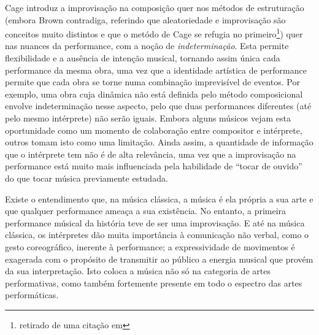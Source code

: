 \documentclass[../main.tex]{subfiles}
\begin{document}
Cage introduz a improvisação na composição quer nos métodos de estruturação (embora Brown contradiga, referindo que aleatoriedade e improvisação são conceitos muito distintos e que o metódo de Cage se refugia no primeiro\footnote{retirado de uma citação em\cite{derek}}) quer nas nuances da performance, com a noção de \textsl{indeterminação}\cite{cage1961}. Esta permite flexibilidade e a ausência de intenção musical, tornando assim única cada performance da mesma obra\cite{cage1961,goldberg}, uma vez que a identidade artística de performance permite que cada obra se torne numa combinação imprevisível de eventos\cite{goldberg_battcock}. Por exemplo, uma obra cuja dinâmica não está definida pelo método composicional envolve indeterminação nesse aspecto, pelo que duas performances diferentes (até pelo mesmo intérprete) não serão iguais. Embora alguns músicos vejam esta oportunidade como um momento de colaboração entre compositor e intérprete, outros tomam isto como uma limitação\cite{derek}. Ainda assim, a quantidade de informação que o intérprete tem não é de alta relevância, uma vez que a improvisação na performance está muito mais influenciada pela habilidade de \enquote{tocar de ouvido} do que tocar música previamente estudada\cite{gabrielsson}.

Existe o entendimento que, na música clássica, a música é ela própria a sua arte e que qualquer performance ameaça a sua existência. No entanto, a primeira performance músical da história teve de ser uma improvisação\cite{derek}. E até na música clássica, os intérpretes dão muita importância à comunicação não verbal, como o gesto coreográfico, inerente à performance; a expressividade de movimentos é exagerada com o propósito de transmitir ao público a energia musical que provém da sua interpretação\cite{urbaniak}. Isto coloca a música não só na categoria de artes performativas, como também fortemente presente em todo o espectro das artes performáticas.
\end{document}
